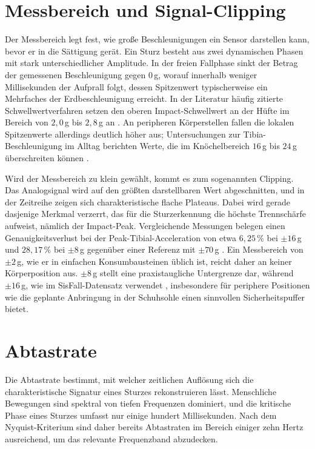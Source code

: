 \documentclass[11pt,a4paper,oneside]{report}
\begin{document}
\section{Messbereich und Signal-Clipping}
\label{sec:range}
Der Messbereich legt fest, wie große Beschleunigungen ein Sensor darstellen
kann, bevor er in die Sättigung gerät. Ein Sturz besteht aus zwei
dynamischen Phasen mit stark unterschiedlicher Amplitude. In der freien
Fallphase sinkt der Betrag der gemessenen Beschleunigung gegen $0$\,g,
worauf innerhalb weniger Millisekunden der Aufprall folgt, dessen Spitzenwert
typischerweise ein Mehrfaches der Erdbeschleunigung erreicht. In der
Literatur häufig zitierte Schwellwertverfahren setzen den oberen
Impact-Schwellwert an der Hüfte im Bereich von $2{,}0$\,g bis $2{,}8$\,g
an \cite{bagala2012,us10152869}. An peripheren Körperstellen fallen die
lokalen Spitzenwerte allerdings deutlich höher aus; Untersuchungen zur
Tibia-Beschleunigung im Alltag berichten Werte, die im Knöchelbereich
$16$\,g bis $24$\,g überschreiten können \cite{cornelissen2023clipping}.

Wird der Messbereich zu klein gewählt, kommt es zum sogenannten Clipping.
Das Analogsignal wird auf den größten darstellbaren Wert abgeschnitten,
und in der Zeitreihe zeigen sich charakteristische flache Plateaus. Dabei
wird gerade dasjenige Merkmal verzerrt, das für die Sturzerkennung die
höchste Trennschärfe aufweist, nämlich der Impact-Peak.
Vergleichende Messungen belegen einen Genauigkeitsverlust bei der
Peak-Tibial-Acceleration von etwa $6{,}25\,\%$ bei $\pm 16$\,g und
$28{,}17\,\%$ bei $\pm 8$\,g gegenüber einer Referenz mit $\pm 70$\,g
\cite{cornelissen2023clipping}. Ein Messbereich von $\pm 2$\,g, wie er in
einfachen Konsumbausteinen üblich ist, reicht daher an keiner
Körperposition aus. $\pm 8$\,g stellt eine praxistaugliche Untergrenze
dar, während $\pm 16$\,g, wie im SisFall-Datensatz verwendet
\cite{sucerquia2017sisfall}, insbesondere für periphere Positionen wie
die geplante Anbringung in der Schuhsohle einen sinnvollen
Sicherheitspuffer bietet.

\section{Abtastrate}
\label{sec:samplingrate}
Die Abtastrate bestimmt, mit welcher zeitlichen Auflösung sich die
charakteristische Signatur eines Sturzes rekonstruieren lässt.
Menschliche Bewegungen sind spektral von tiefen Frequenzen dominiert, und
die kritische Phase eines Sturzes umfasst nur einige hundert Millisekunden.
Nach dem Nyquist-Kriterium sind daher bereits Abtastraten im Bereich
einiger zehn Hertz ausreichend, um das relevante Frequenzband abzudecken.
\end{document}
